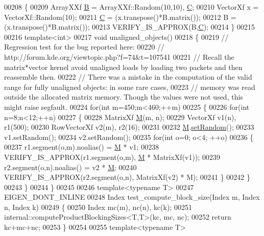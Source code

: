 \begin{DoxyCode}
00208 \{
00209   ArrayXXf \hyperlink{group___core___module_class_eigen_1_1_matrix}{B} = ArrayXXf::Random(10,10), \hyperlink{group___core___module}{C};
00210   VectorXf x = VectorXf::Random(10);
00211   \hyperlink{group___core___module}{C} = (x.transpose()*B.matrix());
00212   B = (x.transpose()*B.matrix());
00213   VERIFY\_IS\_APPROX(B,\hyperlink{group___core___module}{C});
00214 \}
00215 
00216 \textcolor{keyword}{template}<\textcolor{keywordtype}{int}>
00217 \textcolor{keywordtype}{void} unaligned\_objects()
00218 \{
00219   \textcolor{comment}{// Regression test for the bug reported here:}
00220   \textcolor{comment}{// http://forum.kde.org/viewtopic.php?f=74&t=107541}
00221   \textcolor{comment}{// Recall the matrix*vector kernel avoid unaligned loads by loading two packets and then reassemble then.}
00222   \textcolor{comment}{// There was a mistake in the computation of the valid range for fully unaligned objects: in some rare
       cases,}
00223   \textcolor{comment}{// memory was read outside the allocated matrix memory. Though the values were not used, this might raise
       segfault.}
00224   \textcolor{keywordflow}{for}(\textcolor{keywordtype}{int} m=450;m<460;++m)
00225   \{
00226     \textcolor{keywordflow}{for}(\textcolor{keywordtype}{int} n=8;n<12;++n)
00227     \{
00228       MatrixXf \hyperlink{group___core___module_class_eigen_1_1_matrix}{M}(m, n);
00229       VectorXf v1(n), r1(500);
00230       RowVectorXf v2(m), r2(16);
00231 
00232       \hyperlink{group___core___module_class_eigen_1_1_matrix}{M}.\hyperlink{class_eigen_1_1_plain_object_base_af0e576a0e1aefc9ee346de44cc352ba3}{setRandom}();
00233       v1.setRandom();
00234       v2.setRandom();
00235       \textcolor{keywordflow}{for}(\textcolor{keywordtype}{int} o=0; o<4; ++o)
00236       \{
00237         r1.segment(o,m).noalias() = \hyperlink{group___core___module_class_eigen_1_1_matrix}{M} * v1;
00238         VERIFY\_IS\_APPROX(r1.segment(o,m), \hyperlink{group___core___module_class_eigen_1_1_matrix}{M} * MatrixXf(v1));
00239         r2.segment(o,n).noalias() = v2 * \hyperlink{group___core___module_class_eigen_1_1_matrix}{M};
00240         VERIFY\_IS\_APPROX(r2.segment(o,n), MatrixXf(v2) * M);
00241       \}
00242     \}
00243   \}
00244 \}
00245 
00246 \textcolor{keyword}{template}<\textcolor{keyword}{typename} T>
00247 EIGEN\_DONT\_INLINE
00248 Index test\_compute\_block\_size(Index m, Index n, Index k)
00249 \{
00250   Index mc(m), nc(n), kc(k);
00251   internal::computeProductBlockingSizes<T,T>(kc, mc, nc);
00252   \textcolor{keywordflow}{return} kc+mc+nc;
00253 \}
00254 
00255 \textcolor{keyword}{template}<\textcolor{keyword}{typename} T>

\end{DoxyCode}
